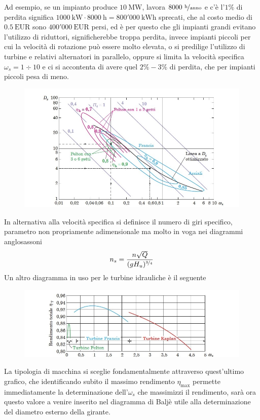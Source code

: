 \documentclass[a4paper, 15pt]{article}
\begin{document}
\begin{adjustwidth}{2in}{}
	Ad esempio, se un impianto produce $10~\text{MW}$, lavora $8000~\nicefrac{\text{h}}{\text{anno}}$ e c'è l'$1\%$ di perdita significa $1000~\text{kW}\cdot8000~\text{h} = 800'000~\text{kWh}$ sprecati, che al costo medio di $0.5~\text{EUR}$ sono $400'000~\text{EUR}$ persi, ed è per questo che gli impianti grandi evitano l'utilizzo di riduttori, significherebbe troppa perdita, invece impianti piccoli per cui la velocità di rotazione può essere molto elevata, o si predilige l'utilizzo di turbine e relativi alternatori in parallelo, oppure si limita la velocità specifica $\omega_s = 1\div10$ e ci si accontenta di avere quel $2\%-3\%$ di perdita, che per impianti piccoli pesa di meno. 	
\begin{figure}[H]
	\centering
	\includegraphics[width=0.6\linewidth]{immagini/dim2}
	\label{fig:dim2}
\end{figure}
	In alternativa alla velocità specifica si definisce il numero di giri specifico, parametro non propriamente adimensionale ma molto in voga nei diagrammi anglosassoni
	\[n_s = \dfrac{n\sqrt{Q}}{(gH_u)^{\nicefrac{3}{4}}}\]
	Un altro diagramma in uso per le turbine idrauliche è il seguente
\begin{figure}[H]
	\centering
	\includegraphics[width=0.6\linewidth]{immagini/dim3}
	\label{fig:dim3}
\end{figure}
	La tipologia di macchina si sceglie fondamentalmente attraverso quest'ultimo grafico, che identificando subito il massimo rendimento $\eta_{\max}$ permette immediatamente la determinazione dell'$\omega_s$ che massimizzi il rendimento, sarà ora questo valore a venire inserito nel diagramma di Baljè utile alla determinazione del diametro esterno della girante. \newline 
	

\end{adjustwidth}
\end{document}
